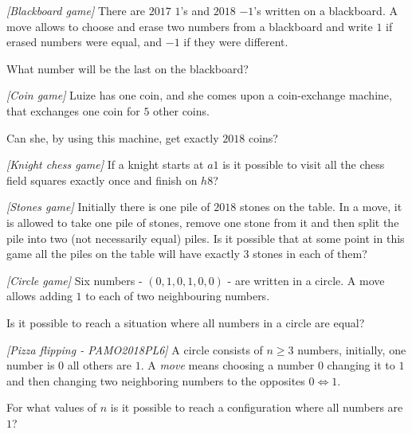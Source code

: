 

%




\noindent 



\begin{problem}
\textit{[Blackboard game]}
There are $2017$ $1$'s and $2018$ $-1$'s written on a blackboard. A move allows to choose and erase two numbers from a blackboard and write $1$ if erased numbers were equal, and $-1$ if they were different. 

What number will be the last on the blackboard?
\end{problem}
%

\begin{problem}
\textit{[Coin game]}
Luize has one coin, and she comes upon a coin-exchange machine, that exchanges one coin for $5$ other coins. 

Can she, by using this machine, get exactly $2018$ coins? 
\end{problem}
%

\begin{problem}
\textit{[Knight chess game]}
If a knight starts at $a1$ is it possible to visit all the chess field squares exactly once and finish on $h8$?
\end{problem}
%

\begin{problem}
\textit{[Stones game]}
Initially there is one pile of $2018$ stones on the table. In a move, it is allowed to take one pile of stones, remove one stone from it and then split the pile into two (not necessarily equal) piles. 
Is it possible that at some point in this game all the piles on the table will have exactly $3$ stones in each of them?
\end{problem}
%

\begin{problem}
\textit{[Circle game]}
Six numbers - $(0,1,0,1,0,0)$ - are written in a circle. A move allows adding $1$ to each of two neighbouring numbers. 

Is it possible to reach a situation where all numbers in a circle are equal?
\end{problem}
%

\begin{problem}
\textit{[Pizza flipping - PAMO2018PL6]}
A circle consists of $n\ge3$ numbers, initially, one number is $0$ all others are $1$. A \textit{move} means choosing a number $0$ changing it to $1$ and then changing two neighboring numbers to the opposites $0\Leftrightarrow1$.

For what values of $n$ is it possible to reach a configuration where all numbers are $1$?
\end{problem}
%

